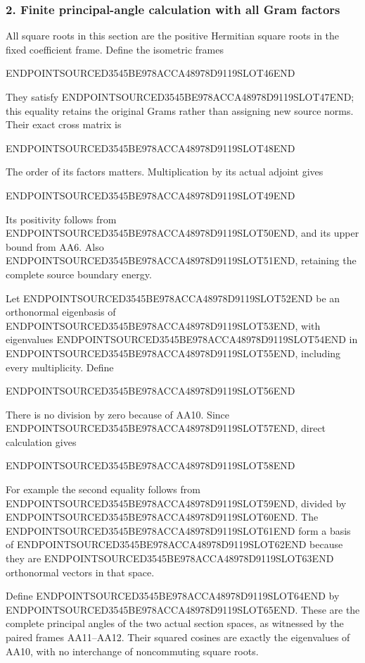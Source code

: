 \subsubsection{2. Finite principal-angle calculation with all Gram factors}\label{endpoint-all_degree_angle_review--finite-principal-angle-calculation-with-all-gram-factors}

All square roots in this section are the positive Hermitian square roots in the fixed coefficient frame. Define the isometric frames

ENDPOINTSOURCED3545BE978ACCA48978D9119SLOT46END

They satisfy ENDPOINTSOURCED3545BE978ACCA48978D9119SLOT47END; this equality retains the original Grams rather than assigning new source norms. Their exact cross matrix is

ENDPOINTSOURCED3545BE978ACCA48978D9119SLOT48END

The order of its factors matters. Multiplication by its actual adjoint gives

ENDPOINTSOURCED3545BE978ACCA48978D9119SLOT49END

Its positivity follows from ENDPOINTSOURCED3545BE978ACCA48978D9119SLOT50END, and its upper bound from AA6. Also ENDPOINTSOURCED3545BE978ACCA48978D9119SLOT51END, retaining the complete source boundary energy.

Let ENDPOINTSOURCED3545BE978ACCA48978D9119SLOT52END be an orthonormal eigenbasis of ENDPOINTSOURCED3545BE978ACCA48978D9119SLOT53END, with eigenvalues ENDPOINTSOURCED3545BE978ACCA48978D9119SLOT54END in ENDPOINTSOURCED3545BE978ACCA48978D9119SLOT55END, including every multiplicity. Define

ENDPOINTSOURCED3545BE978ACCA48978D9119SLOT56END

There is no division by zero because of AA10. Since ENDPOINTSOURCED3545BE978ACCA48978D9119SLOT57END, direct calculation gives

ENDPOINTSOURCED3545BE978ACCA48978D9119SLOT58END

For example the second equality follows from ENDPOINTSOURCED3545BE978ACCA48978D9119SLOT59END, divided by ENDPOINTSOURCED3545BE978ACCA48978D9119SLOT60END. The ENDPOINTSOURCED3545BE978ACCA48978D9119SLOT61END form a basis of ENDPOINTSOURCED3545BE978ACCA48978D9119SLOT62END because they are ENDPOINTSOURCED3545BE978ACCA48978D9119SLOT63END orthonormal vectors in that space.

Define ENDPOINTSOURCED3545BE978ACCA48978D9119SLOT64END by ENDPOINTSOURCED3545BE978ACCA48978D9119SLOT65END. These are the complete principal angles of the two actual section spaces, as witnessed by the paired frames AA11--AA12. Their squared cosines are exactly the eigenvalues of AA10, with no interchange of noncommuting square roots.

